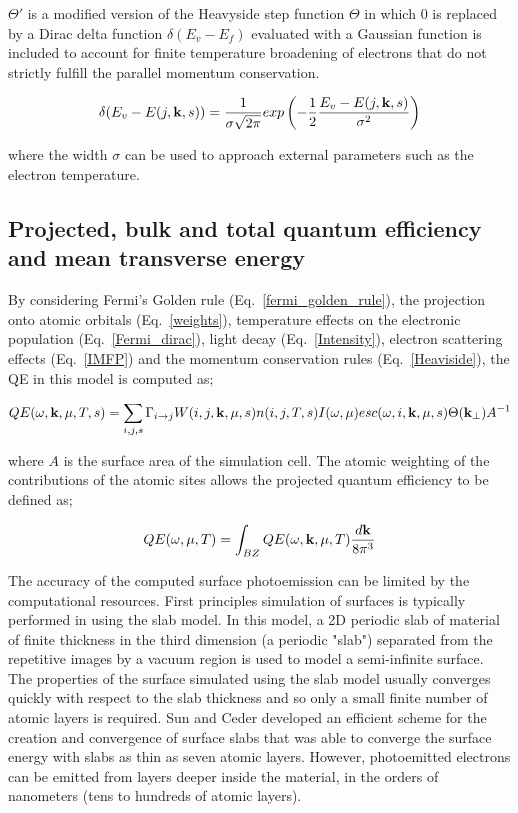 \documentclass[a4paper,11pt,twoside]{book}
\begin{document}
$\Theta'$ is a modified version of the Heavyside step function $\Theta$ in which $0$ is replaced by a Dirac delta function $\delta(E_v - E_f)$ evaluated with a Gaussian function is included to account for finite temperature broadening of electrons that do not strictly fulfill the parallel momentum conservation. 

\begin{equation}
    \delta(E_v - E(j,{\bf{k}},s)) = \frac{1}{\sigma \sqrt{2\pi}}exp \left (-\frac{1}{2}\frac{E_v - E(j,{\bf{k}},s)}{\sigma^2}\right )
    \label{gaussian_vac}
\end{equation}

where the width $\sigma$ can be used to approach external parameters such as the electron temperature.

\subsection{Projected, bulk and total quantum efficiency and mean transverse energy}

By considering Fermi's Golden rule (Eq.~\ref{fermi_golden_rule}), the projection onto atomic orbitals (Eq.~\ref{weights}), temperature effects on the electronic population (Eq.~\ref{Fermi_dirac}), light decay (Eq.~\ref{Intensity}), electron scattering effects (Eq.~\ref{IMFP}) and the momentum conservation rules (Eq.~\ref{Heaviside}), the QE in this model is computed as;

\begin{equation}
QE{(\omega, {\bf{k}},\mu, T, s)}= \sum_{i,j,s} \Gamma_{i \rightarrow j} W( i,j,{\bf{k}},\mu,s) n(i,j,T,s) I(\omega,\mu) esc(\omega,i,{\bf{k}},\mu,s) \Theta({\bf{k}}_\perp)  A^{-1}
    \label{projected_qe}
\end{equation}

where $A$ is the surface area of the simulation cell. The atomic weighting of the contributions of the atomic sites allows the projected quantum efficiency to be defined as;
 
\begin{equation}
QE{(\omega ,\mu, T)}= \int_{BZ} QE{(\omega, {\bf{k}},\mu, T)}\frac{d{\bf{k}}}{8\pi^3}
    \label{projected_qe}
\end{equation}

The accuracy of the computed surface photoemission can be limited by the computational resources. First principles simulation of surfaces is typically performed in using the slab model. In this model, a 2D periodic slab of material of finite thickness in the third dimension (a periodic "slab") separated from the repetitive images by a vacuum region is used to  model a semi-infinite surface. The properties of the surface simulated using the slab model usually converges quickly with respect to the slab thickness and so only a small finite number of atomic layers is required. Sun and Ceder developed an efficient scheme for the creation and convergence of surface slabs that was able to converge the surface energy with slabs as thin as seven atomic layers. However, photoemitted electrons can be emitted from layers deeper inside the material, in the orders of nanometers (tens to hundreds of atomic layers).
\end{document}
